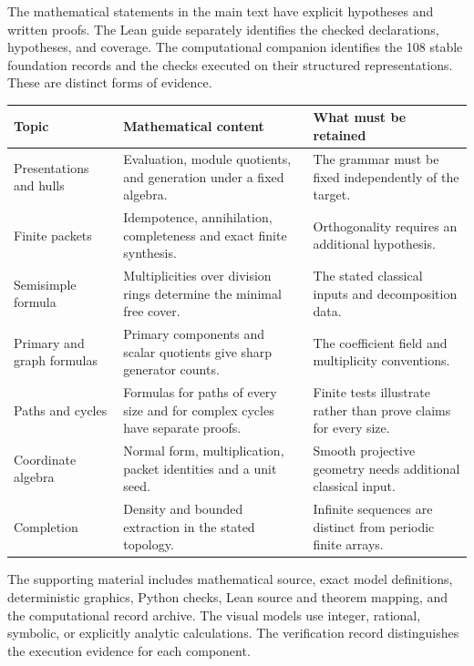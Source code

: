 
The mathematical statements in the main text have explicit hypotheses and written proofs. The Lean guide separately identifies the checked declarations, hypotheses, and coverage. The computational companion identifies the 108 stable foundation records and the checks executed on their structured representations. These are distinct forms of evidence.

{\small\begin{tabularx}{\linewidth}{@{}>{\raggedright\arraybackslash}p{.23\linewidth}Y>{\raggedright\arraybackslash}p{.25\linewidth}@{}}\toprule
\textbf{Topic} & \textbf{Mathematical content} & \textbf{What must be retained}\\\midrule
Presentations and hulls & Evaluation, module quotients, and generation under a fixed algebra. & The grammar must be fixed independently of the target.\\
Finite packets & Idempotence, annihilation, completeness and exact finite synthesis. & Orthogonality requires an additional hypothesis.\\
Semisimple formula & Multiplicities over division rings determine the minimal free cover. & The stated classical inputs and decomposition data.\\
Primary and graph formulas & Primary components and scalar quotients give sharp generator counts. & The coefficient field and multiplicity conventions.\\
Paths and cycles & Formulas for paths of every size and for complex cycles have separate proofs. & Finite tests illustrate rather than prove claims for every size.\\
Coordinate algebra & Normal form, multiplication, packet identities and a unit seed. & Smooth projective geometry needs additional classical input.\\
Completion & Density and bounded extraction in the stated topology. & Infinite sequences are distinct from periodic finite arrays.\\\bottomrule\end{tabularx}}

The supporting material includes mathematical source, exact model definitions, deterministic graphics, Python checks, Lean source and theorem mapping, and the computational record archive. The visual models use integer, rational, symbolic, or explicitly analytic calculations. The verification record distinguishes the execution evidence for each component.

